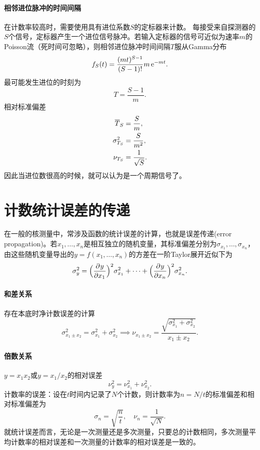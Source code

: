 \paragraph{相邻进位脉冲的时间间隔}
在计数率较高时，需要使用具有进位系数$S$的定标器来计数。
每接受来自探测器的$S$个信号，定标器产生一个进位信号脉冲。若输入定标器的信号可近似为速率$m$的Poisson流（死时间可忽略），则相邻进位脉冲时间间隔$T$服从Gamma分布
\begin{equation}\label{eq:nrd-scaler-interval}
	f_S(t) = \frac{(mt)^{S-1}}{(S - 1)!}m\mathop{}\!\mathrm{e}^{-mt}.
\end{equation}
最可能发生进位的时刻为
\[
	T = \frac{S - 1}m.
\]
相对标准偏差
\begin{subequations}\label{eq:nrd-scaler-interval-moments}
	\begin{align}
		\overline{T}_S &= \frac Sm,\\
		\sigma_{T_S}^2 &= \frac S{m^2},\\
		\nu_{T_S} &= \frac1{\sqrt S}.
	\end{align}
\end{subequations}
因此当进位数很高的时候，就可以认为是一个周期信号了。

\section{计数统计误差的传递}

在一般的核测量中，常涉及函数的统计误差的计算，也就是误差传递(error propagation)。若$x_1,\ldots,x_n$是相互独立的随机变量，其标准偏差分别为$\sigma_{x_1},\ldots,\sigma_{x_n}$，由这些随机变量导出的$y = f(x_1,\ldots,x_n)$的方差在一阶Taylor展开近似下为
\begin{equation}\label{eq:nrd-variance-propagation}
	\sigma_y^2 = \Bigl(\frac{\partial^{}y}{\partial{x_1}^{}}\Bigr)^2\sigma_{x_1}^2 + \cdots + \Bigl(\frac{\partial^{}y}{\partial{x_n}^{}}\Bigr)^2\sigma_{x_n}^2.
\end{equation}
\paragraph{和差关系}存在本底时净计数误差的计算
\begin{equation}\label{eq:nrd-difference-uncertainty}
	\sigma_{x_1\pm x_2}^2 = \sigma_{x_1}^2 + \sigma_{x_2}^2 \implies \nu_{x_1\pm x_2} = \frac{\sqrt{\sigma_{x_1}^2 + \sigma_{x_2}^2}}{x_1 \pm x_2}.
\end{equation}

\paragraph{倍数关系}$y = x_1x_2$或$y = x_1/x_2$的相对误差
\begin{equation}\label{eq:nrd-product-relative-variance}
	\nu_y^2 = \nu_{x_1}^2 + \nu_{x_2}^2.
\end{equation}
计数率的误差：设在$t$时间内记录了$N$个计数，则计数率为$n = N/t$的标准偏差和相对标准偏差为
\begin{equation}\label{eq:nrd-count-rate-uncertainty}
	\sigma_n = \sqrt{\frac nt},\quad\nu_n = \frac1{\sqrt N}.
\end{equation}
就统计误差而言，无论是一次测量还是多次测量，只要总的计数相同，多次测量平均计数率的相对误差和一次测量的计数率的相对误差是一致的。
